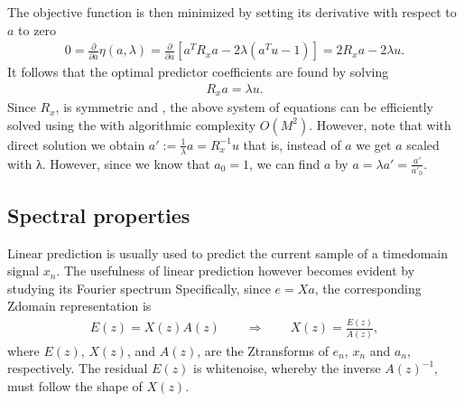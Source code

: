 \documentclass[letterpaper,10pt,english]{jupyterBook}
\begin{document}
\sphinxAtStartPar
The objective function is then minimized by setting its derivative with
respect to \(a\) to zero
\begin{equation*}
\begin{split} 0 = \frac\partial{\partial a}\eta(a,\lambda) =
\frac\partial{\partial a} \left[a^T R_x a -2\lambda\left(a^T u -
1\right)\right] = 2 R_x a - 2 \lambda u. \end{split}
\end{equation*}
\sphinxAtStartPar
It follows that the optimal predictor coefficients are found by solving
\begin{equation*}
\begin{split} R_x a = \lambda u. \end{split}
\end{equation*}
\sphinxAtStartPar
Since \(R_{x}\), is symmetric and
, the above
system of equations can be efficiently solved using the  with
algorithmic complexity \(O(M^{2})\). However, note that with
direct solution we obtain \( a':=\frac1\lambda a = R_x^{-1}u \) that
is, instead of \(a\) we get \(a\) scaled with λ. However, since we know that
\(a_{0}=1\), we can find \(a\) by \( a=\lambda a' =
\frac{a'}{a'_0}. \)


\subsection{Spectral properties}
\label{\detokenize{Representations/Linear_prediction:spectral-properties}}
\sphinxAtStartPar
Linear prediction is usually used to predict the current sample of a
time\sphinxhyphen{}domain signal \(x_{n}\). The usefulness of linear prediction
however becomes evident by studying its Fourier spectrum Specifically,
since \(e=Xa\), the corresponding Z\sphinxhyphen{}domain representation is
\begin{equation*}
\begin{split} E(z) = X(z)A(z)\qquad\Rightarrow\qquad X(z)=\frac{E(z)}{A(z)},
\end{split}
\end{equation*}
\sphinxAtStartPar
where \(E(z)\), \(X(z)\), and \(A(z)\), are the Z\sphinxhyphen{}transforms of
\(e_{n}\), \(x_{n}\) and \(a_{n}\), respectively. The
residual \(E(z)\) is white\sphinxhyphen{}noise, whereby the inverse \(A(z)^{-1}\),
must follow the shape of \(X(z)\).
\end{document}
